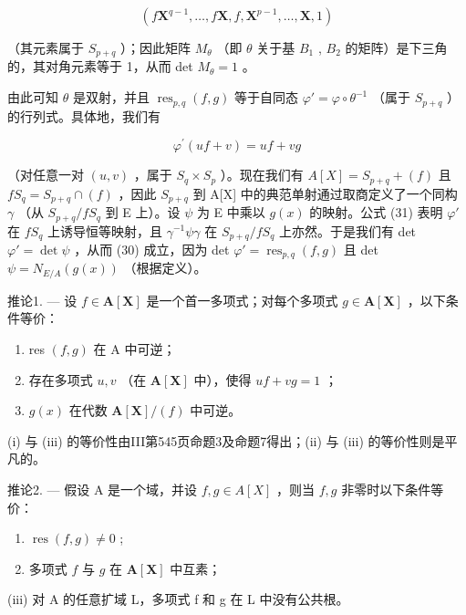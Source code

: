 \[
(f \mathbf {X} ^ {q - 1}, \dots , f \mathbf {X}, f, \mathbf {X} ^ {p - 1}, \dots , \mathbf {X}, 1)
\]

（其元素属于 \(S_{p+q}\) ）；因此矩阵 \(M_{\theta}\) （即 \(\theta\) 关于基 \(B_{1}\) , \(B_{2}\) 的矩阵）是下三角的，其对角元素等于 1，从而 det \(M_{\theta}=1\) 。

由此可知 \(\theta\) 是双射，并且 \(\operatorname{res}_{p,q}(f,g)\) 等于自同态 \(\varphi' = \varphi \circ \theta^{-1}\) （属于 \(S_{p + q}\) ）的行列式。具体地，我们有

\[
\varphi^ {\prime} (u f + v) = u f + v g\tag{31}
\]

（对任意一对 \((u,v)\) ，属于 \(S_{q}\times S_{p}\) ）。现在我们有 \(A[X]=S_{p+q}+(f)\) 且 \(fS_{q}=S_{p+q}\cap(f)\) ，因此 \(S_{p+q}\) 到 A{[}X{]} 中的典范单射通过取商定义了一个同构 \(\gamma\) （从 \(S_{p+q}/fS_{q}\) 到 E 上）。设 \(\psi\) 为 E 中乘以 \(g(x)\) 的映射。公式 (31) 表明 \(\varphi'\) 在 \(fS_{q}\) 上诱导恒等映射，且 \(\gamma^{-1}\psi\gamma\) 在 \(S_{p+q}/fS_{q}\) 上亦然。于是我们有 det \(\varphi'=\det\psi\) ，从而 (30) 成立，因为 det \(\varphi'=\operatorname{res}_{p,q}(f,g)\) 且 det \(\psi=N_{E/A}(g(x))\) （根据定义）。

推论1. --- 设 \(f \in \mathbf{A}[\mathbf{X}]\) 是一个首一多项式；对每个多项式 \(g \in \mathbf{A}[\mathbf{X}]\) ，以下条件等价：

\begin{enumerate}
\def\labelenumi{(\roman{enumi})}
\item
  res \((f,g)\) 在 A 中可逆；
\item
  存在多项式 \(u, v\) （在 \(\mathbf{A}[\mathbf{X}]\) 中），使得 \(uf + vg = 1\) ；
\item
  \(g(x)\) 在代数 \(\mathbf{A}[\mathbf{X}] / (f)\) 中可逆。
\end{enumerate}

(i) 与 (iii) 的等价性由III第545页命题3及命题7得出；(ii) 与 (iii) 的等价性则是平凡的。

推论2. --- 假设 A 是一个域，并设 \(f, g \in A[X]\) ，则当 \(f, g\) 非零时以下条件等价：

\begin{enumerate}
\def\labelenumi{(\roman{enumi})}
\item
  \(\operatorname{res}(f, g) \neq 0\) ;
\item
  多项式 \(f\) 与 \(g\) 在 \(\mathbf{A}[\mathbf{X}]\) 中互素；
\end{enumerate}

(iii) 对 A 的任意扩域 L，多项式 f 和 g 在 L 中没有公共根。

